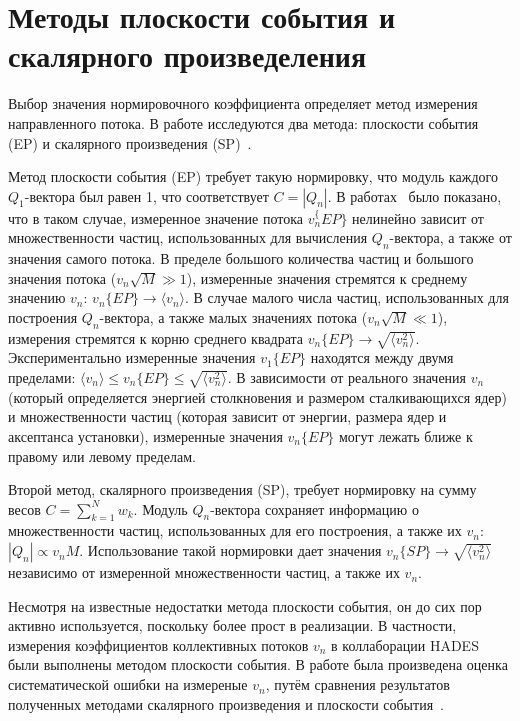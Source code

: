 \section{Методы плоскости события и скалярного произведеления}

Выбор значения нормировочного коэффициента определяет метод измерения направленного потока. 
В работе исследуются два метода: плоскости события (EP) и скалярного произведения (SP)~\cite{Mamaev:2020lpi}. 

Метод плоскости события (EP) требует такую нормировку, что модуль каждого $Q_1$-вектора был равен 1, что соответствует $C=|Q_n|$. 
В работах~\cite{Borghini:2001vi, Bhalerao:2006tp} было показано, что в таком случае, измеренное значение потока $v_n^\{EP\}$ нелинейно зависит от множественности частиц, использованных для вычисления $Q_n$-вектора, а также от значения самого потока. 
В пределе большого количества частиц и большого значения потока ($v_n \sqrt{M} \gg 1$), измеренные значения стремятся к среднему значению $v_n$: $v_n\{EP\} \xrightarrow{} \langle v_n \rangle$. 
В случае малого числа частиц, использованных для построения $Q_n$-вектора, а также малых значениях потока ($v_n \sqrt{M} \ll 1$), измерения стремятся к корню среднего квадрата $ v_n\{EP\} \xrightarrow{} \sqrt{ \langle v_n^2 \rangle }$.
Экспериментально измеренные значения $v_1\{EP\}$ находятся между двумя пределами: $ \langle v_n \rangle \leq v_n\{EP\} \leq \sqrt{ \langle v_n^2 \rangle } $.
В зависимости от реального значения $v_n$ (который определяется энергией столкновения и размером сталкивающихся ядер) и множественности частиц (которая зависит от энергии, размера ядер и аксептанса установки), измеренные значения $v_n\{EP\}$ могут лежать ближе к правому или левому пределам.

Второй метод, скалярного произведения (SP), требует нормировку на сумму весов $C=\sum_{k=1}^N w_k$.
Модуль $Q_n$-вектора сохраняет информацию о множественности частиц, использованных для его построения, а также их $v_n$: $|Q_n| \propto v_n M$.
Использование такой нормировки дает значения $v_n\{SP\} \xrightarrow{} \sqrt{\langle v_n^2 \rangle}$ независимо от измеренной множественности частиц, а также их $v_n$.

Несмотря на известные недостатки метода плоскости события, он до сих пор активно используется, поскольку более прост в реализации. 
В частности, измерения коэффициентов коллективных потоков $v_n$ в коллаборации HADES~\cite{HADES:2020lob} были выполнены методом плоскости события. 
В работе была произведена оценка систематической ошибки на измереные $v_n$, путём сравнения результатов полученных методами скалярного произведения и плоскости события~\cite{Mamaev:2020lpi}.

